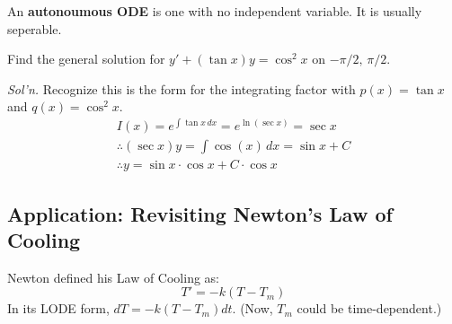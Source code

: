 \documentclass[../main.tex]{subfiles}
\begin{document}
\begin{definition}
    An \textbf{autonoumous ODE} is one with no independent variable. It is usually seperable.
\end{definition}

\begin{example}[]
    Find the general solution for \( y'+ ( \tan x ) y=\cos^{2}x \)  on \( -\pi/2,\, \pi/2 \).

    \textit{Sol'n.} Recognize this is the form for the integrating factor with \( p(x)=\tan x \) and \( q(x) = \cos^{2}x \).
    \begin{align*}
        I(x)= e^{\int \tan x \,dx} = e^{\ln(\sec x)} = \sec x \\
        \therefore (\sec x) y = \int \cos (x) \,dx = \sin x + C \\
        \therefore y = \sin x \cdot \cos x + C \cdot \cos x
    \end{align*}
\end{example}


\subsection{Application: Revisiting Newton's Law of Cooling}

Newton defined his Law of Cooling as:
\[ T' = -k(T-T_m) \]
In its LODE form, \( dT = -k(T-T_m)dt \). (Now, \( T_m \) could be time-dependent.)
\end{document}

